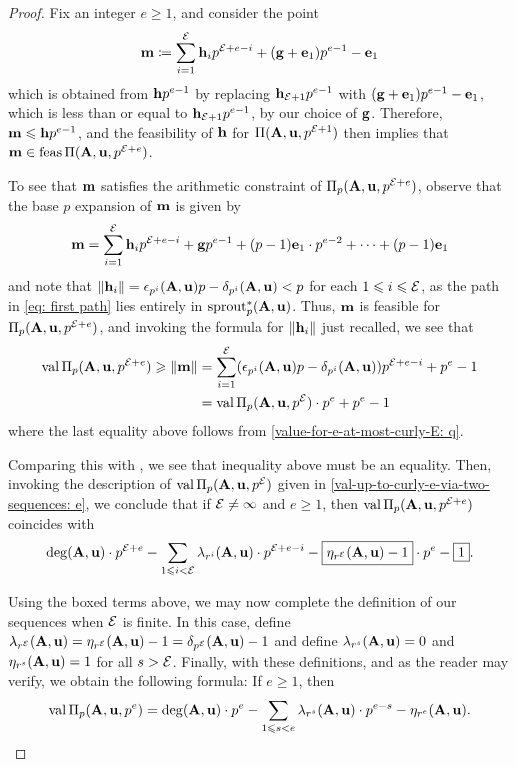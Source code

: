 \documentclass{article}
\begin{document}
\begin{proof}
   Fix an integer $e \geq 1$, and consider the point
   \[
      \mathbf{m} \coloneqq \sum_{i=1}^{\mathcal{E}} \mathbf{h}_i p^{\mathcal{E} + e-i} + (\mathbf{g}+\mathbf{e}_1)p^{e-1} - \mathbf{e}_1
   \]
   which is obtained from $\mathbf{h}p^{e-1}$ by replacing $\mathbf{h}_{\mathcal{E}+1}p^{e-1}$ with  $(\mathbf{g}+\mathbf{e}_1)p^{e-1} - \mathbf{e}_1$, which is less than or equal to $\mathbf{h}_{\mathcal{E}+1} p^{e-1}$, by our choice of $\mathbf{g}$.
   Therefore, $\mathbf{m} \leqslant \mathbf{h}p^{e-1}$, and the feasibility of $\mathbf{h}$ for $\Pi(\mathbf{A},\mathbf{u}, p^{\mathcal{E}+1})$ then implies that $\mathbf{m} \in \operatorname{feas} \Pi(\mathbf{A},\mathbf{u}, p^{\mathcal{E}+e})$.

   To see that $\mathbf{m}$ satisfies the arithmetic constraint of $\Pi_p(\mathbf{A},\mathbf{u}, p^{\mathcal{E}+e})$, observe that the base $p$ expansion of $\mathbf{m}$ is given by
   \[
      \mathbf{m} = \sum_{i=1}^{\mathcal{E}} \mathbf{h}_i p^{\mathcal{E} + e-i} + \mathbf{g}p^{e-1} + (p-1) \mathbf{e}_1 \cdot p^{e-2} + \cdots + (p-1)\mathbf{e}_1
   \]
   and note that $\| \mathbf{h}_i \| = \epsilon_{p^i}(\mathbf{A},\mathbf{u})p-\delta_{p^i}(\mathbf{A},\mathbf{u}) < p$ for each $1 \leqslant i \leqslant \mathcal{E}$, as the path in \eqref{eq: first path} lies entirely in $\operatorname{sprout}_p^{\ast}(\mathbf{A},\mathbf{u})$.
   Thus, $\mathbf{m}$ is feasible for $\Pi_p(\mathbf{A},\mathbf{u}, p^{\mathcal{E}+e})$, and invoking the formula for $\| \mathbf{h}_i \|$ just recalled, we see that
   \begin{align*}
     \operatorname{val} \Pi_p(\mathbf{A},\mathbf{u}, p^{\mathcal{E}+e}) \geqslant \| \mathbf{m} \| & = \sum_{i=1}^{\mathcal{E}} (\epsilon_{p^i}(\mathbf{A},\mathbf{u})p-\delta_{p^i}(\mathbf{A},\mathbf{u})) p^{\mathcal{E} + e-i} + p^e-1 \\
         & = \operatorname{val} \Pi_p(\mathbf{A},\mathbf{u}, p^{\mathcal{E}}) \cdot p^e + p^e-1
   \end{align*}
   where the last equality above follows from \eqref{value-for-e-at-most-curly-E: q}.
   
   Comparing this with , we see that inequality above must be an equality.  Then, invoking the description of $\operatorname{val} \Pi_p(\mathbf{A}, \mathbf{u}, p^{\mathcal{E}})$ given in \eqref{val-up-to-curly-e-via-two-sequences: e}, we conclude that if $\mathcal{E} \neq \infty$ and $e \geq 1$, then  $\operatorname{val} \Pi_p(\mathbf{A}, \mathbf{u}, p^{\mathcal{E}+e})$ coincides with
   \[
   \operatorname{deg}(\mathbf{A}, \mathbf{u}) \cdot p^{\mathcal{E}+e} - \sum_{1 \leqslant i < \mathcal{E}} \lambda_{r^i}(\mathbf{A}, \mathbf{u}) \cdot p^{\mathcal{E} + e -i} - \boxed{{\eta_{r^{\mathcal{E}}}(\mathbf{A}, \mathbf{u})}-1} \cdot p^e  - \boxed{1}.  
	\]

Using the boxed terms above, we may now complete the definition of our sequences when $\mathcal{E}$ is finite.  In this case, define $\lambda_{r^{\mathcal{E}}}(\mathbf{A}, \mathbf{u}) =  {\eta_{r^{\mathcal{E}}}(\mathbf{A}, \mathbf{u})}-1 = {\delta_{p^{\mathcal{E}}}(\mathbf{A}, \mathbf{u})}-1$ and define $\lambda_{r^s}(\mathbf{A}, \mathbf{u})= 0$ and $\eta_{r^s}(\mathbf{A}, \mathbf{u}) = 1$ for all $s > \mathcal{E}$.  Finally, with these definitions, and as the reader may verify, we obtain the following formula:  If $e \geq 1$, then
\[
\operatorname{val} \Pi_p(\mathbf{A},\mathbf{u}, p^e) =  \operatorname{deg}(\mathbf{A},\mathbf{u}) \cdot p^e - \sum_{1 \leqslant s < e} \lambda_{r^s}(\mathbf{A}, \mathbf{u}) \cdot  p^{e-s} - \eta_{r^e}(\mathbf{A},\mathbf{u}).
\]


\end{proof}
\end{document}
